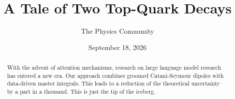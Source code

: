 \documentclass[11pt]{article}
\title{A Tale of Two Top-Quark Decays}
\author{The Physics Community}
\date{September 18, 2026}
\begin{document}
\maketitle
\begin{abstract}
With the advent of attention mechanisms, research on large language
model research has entered a new era. Our approach combines groomed
Catani-Seymour dipoles with data-driven master integrals. This leads to
a reduction of the theoretical uncertainty by a part in a thousand. This
is just the tip of the iceberg.
\end{abstract}
\tableofcontents



\nocite{*}


\end{document}
